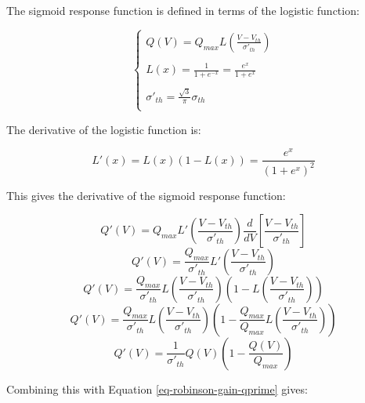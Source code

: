 The sigmoid response function is defined in terms of the logistic function:

\begin{equation}
\left \{
\begin{array}{l}
Q(V) = Q_{max} L \left (\frac{V - V_{th}}{\sigma'_{th}} \right ) \\
\\
L(x) = \frac{1}{1 + e^{-x}} = \frac{e^x}{1 + e^x} \\
\\
\sigma'_{th} = \frac{\sqrt{3}}{\pi}\sigma_{th} \\
\end{array}
\right .
\label{eq-robinson-sigmoid-logistic}
\end{equation}

The derivative of the logistic function is:

\begin{equation}
L'(x) = L(x) \left ( 1 - L(x) \right ) = \frac{e^x}{(1 + e^x)^2}
\label{eq-robinson-logistic-derivative}
\end{equation}

This gives the derivative of the sigmoid response function:

\begin{equation}
Q'(V) = Q_{max} L' \left ( \frac{V - V_{th}}{\sigma'_{th}} \right )
\frac{d}{dV} \left [ \frac{V - V_{th}}{\sigma'_{th}} \right ]
\end{equation}
%
\begin{equation}
Q'(V) = \frac{Q_{max}}{\sigma'_{th}}
L' \left ( \frac{V - V_{th}}{\sigma'_{th}} \right )
\end{equation}
%
\begin{equation}
Q'(V) = \frac{Q_{max}}{\sigma'_{th}}
L \left ( \frac{V - V_{th}}{\sigma'_{th}} \right )
\left ( 1 - L \left ( \frac{V - V_{th}}{\sigma'_{th}} \right ) \right )
\end{equation}
%
\begin{equation}
Q'(V) = \frac{Q_{max}}{\sigma'_{th}}
L \left ( \frac{V - V_{th}}{\sigma'_{th}} \right )
\left ( 1 - \frac{Q_{max}}{Q_{max}}
L \left ( \frac{V - V_{th}}{\sigma'_{th}} \right ) \right )
\end{equation}
%
\begin{equation}
Q'(V) = \frac{1}{\sigma'_{th}} Q(V) \left ( 1 - \frac{Q(V)}{Q_{max}} \right )
\end{equation}

Combining this with Equation \ref{eq-robinson-gain-qprime} gives:

